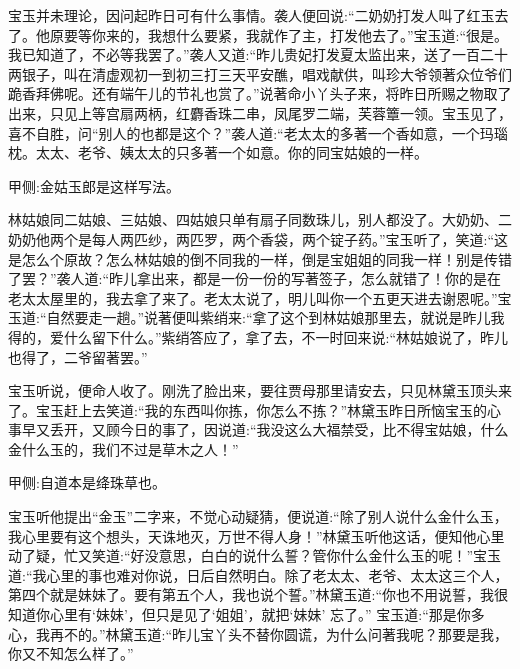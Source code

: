 \begin{parag}
    宝玉并未理论，因问起昨日可有什么事情。袭人便回说:“二奶奶打发人叫了红玉去了。他原要等你来的，我想什么要紧，我就作了主，打发他去了。”宝玉道:“很是。我已知道了，不必等我罢了。”袭人又道:“昨儿贵妃打发夏太监出来，送了一百二十两银子，叫在清虚观初一到初三打三天平安醮，唱戏献供，叫珍大爷领著众位爷们跪香拜佛呢。还有端午儿的节礼也赏了。”说著命小丫头子来，将昨日所赐之物取了出来，只见上等宫扇两柄，红麝香珠二串，凤尾罗二端，芙蓉簟一领。宝玉见了，喜不自胜，问“别人的也都是这个？”袭人道:“老太太的多著一个香如意，一个玛瑙枕。太太、老爷、姨太太的只多著一个如意。你的同宝姑娘的一样。\begin{note}甲侧:金姑玉郎是这样写法。\end{note}林姑娘同二姑娘、三姑娘、四姑娘只单有扇子同数珠儿，别人都没了。大奶奶、二奶奶他两个是每人两匹纱，两匹罗，两个香袋，两个锭子药。”宝玉听了，笑道:“这是怎么个原故？怎么林姑娘的倒不同我的一样，倒是宝姐姐的同我一样！别是传错了罢？”袭人道:“昨儿拿出来，都是一份一份的写著签子，怎么就错了！你的是在老太太屋里的，我去拿了来了。老太太说了，明儿叫你一个五更天进去谢恩呢。”宝玉道:“自然要走一趟。”说著便叫紫绡来:“拿了这个到林姑娘那里去，就说是昨儿我得的，爱什么留下什么。”紫绡答应了，拿了去，不一时回来说:“林姑娘说了，昨儿也得了，二爷留著罢。”
\end{parag}


\begin{parag}
    宝玉听说，便命人收了。刚洗了脸出来，要往贾母那里请安去，只见林黛玉顶头来了。宝玉赶上去笑道:“我的东西叫你拣，你怎么不拣？”林黛玉昨日所恼宝玉的心事早又丢开，又顾今日的事了，因说道:“我没这么大福禁受，比不得宝姑娘，什么金什么玉的，我们不过是草木之人！”\begin{note}甲侧:自道本是绛珠草也。\end{note}宝玉听他提出“金玉”二字来，不觉心动疑猜，便说道:“除了别人说什么金什么玉，我心里要有这个想头，天诛地灭，万世不得人身！”林黛玉听他这话，便知他心里动了疑，忙又笑道:“好没意思，白白的说什么誓？管你什么金什么玉的呢！”宝玉道:“我心里的事也难对你说，日后自然明白。除了老太太、老爷、太太这三个人，第四个就是妹妹了。要有第五个人，我也说个誓。”林黛玉道:“你也不用说誓，我很知道你心里有‘妹妹’，但只是见了‘姐姐’，就把‘妹妹’ 忘了。” 宝玉道:“那是你多心，我再不的。”林黛玉道:“昨儿宝丫头不替你圆谎，为什么问著我呢？那要是我，你又不知怎么样了。”
\end{parag}


